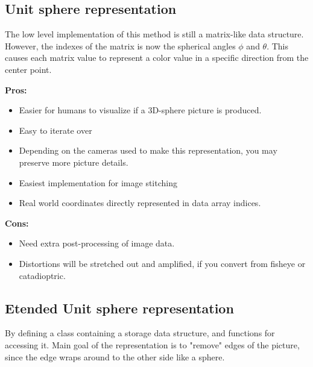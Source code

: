 \subsection{Unit sphere representation}
The low level implementation of this method is still a matrix-like data structure. However, the indexes of the matrix is now the spherical angles $\phi$ and $\theta$. This causes each matrix value to represent a color value in a specific direction from the center point.

\textbf{Pros:}
\begin{itemize}
    \item Easier for humans to visualize if a 3D-sphere picture is produced.
    \item Easy to iterate over
    \item Depending on the cameras used to make this representation, you may preserve more picture details.
    \item Easiest implementation for image stitching
    \item Real world coordinates directly represented in data array indices. 
\end{itemize}

\textbf{Cons:}
\begin{itemize}
    \item Need extra post-processing of image data. 
    \item Distortions will be stretched out and amplified, if you convert from fisheye or catadioptric.
\end{itemize}

\subsection{Etended Unit sphere representation}
By defining a class containing a storage data structure, and functions for accessing it. Main goal of the representation is to "remove" edges of the picture, since the edge wraps around to the other side like a sphere.

